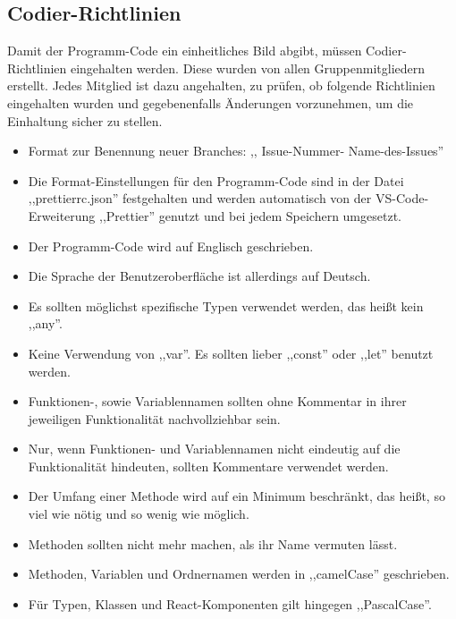 \documentclass[conference]{IEEEtran}
\begin{document}
\subsection{Codier-Richtlinien}
Damit der Programm-Code ein einheitliches Bild abgibt, müssen Codier-Richtlinien eingehalten werden. Diese wurden von allen Gruppenmitgliedern erstellt.
Jedes Mitglied ist dazu angehalten, zu prüfen, ob folgende Richtlinien eingehalten wurden und gegebenenfalls Änderungen vorzunehmen, um die Einhaltung sicher zu stellen.
\begin{itemize}
    \item Format zur Benennung neuer \gls{Branches}: ,, \textlangle \gls{Issue}-Nummer\textrangle- \textlangle Name-des-Issues\textrangle''
    \item Die Format-Einstellungen für den Programm-Code sind in der Datei ,,prettierrc.json'' festgehalten und werden automatisch von der \gls{VS-Code}-Erweiterung ,,\gls{Prettier}'' genutzt und bei jedem Speichern umgesetzt.
    \item Der Programm-Code wird auf Englisch geschrieben.
    \item Die Sprache der Benutzeroberfläche ist allerdings auf Deutsch.
    \item Es sollten möglichst spezifische Typen verwendet werden, das heißt kein ,,any''.
    \item Keine Verwendung von ,,var''. Es sollten lieber ,,const'' oder ,,let'' benutzt werden.
    \item Funktionen-, sowie Variablennamen sollten ohne Kommentar in ihrer jeweiligen Funktionalität nachvollziehbar sein.
    \item Nur, wenn Funktionen- und Variablennamen nicht eindeutig auf die Funktionalität hindeuten, sollten Kommentare verwendet werden.
    \item Der Umfang einer Methode wird auf ein Minimum beschränkt, das heißt, so viel wie nötig und so wenig wie möglich.
    \item Methoden sollten nicht mehr machen, als ihr Name vermuten lässt.
    \item Methoden, Variablen und Ordnernamen werden in ,,\gls{camelCase}'' geschrieben.
    \item Für Typen, Klassen und React-Komponenten gilt hingegen ,,\gls{PascalCase}''.
\end{itemize}

\renewcommand{\arraystretch}{2} %
\end{document}
